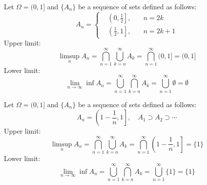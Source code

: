 \begin{example}
    Let $\Omega = (0, 1]$ and $\{A_n\}$ be a sequence of sets defined as follows:
    \begin{equation}
        A_n = \left\{\begin{aligned}
            &\left(0, \frac{1}{2}\right], &\quad n = 2k \\ 
            &\left(\frac{1}{2}, 1\right], &\quad n = 2k + 1
        \end{aligned}\right.
    \end{equation}
    Upper limit:
    \begin{equation}
        \limsup_n A_n = \bigcap_{n=1}^{\infty} \bigcup_{k=n}^{\infty} A_k = \bigcap_{n=1}^{\infty} (0, 1] = (0, 1]
    \end{equation}
    Lower limit:
    \begin{equation}
        \lim_{n \to \infty} \inf A_n = \bigcup_{n=1}^{\infty} \bigcap_{k=n}^{\infty} A_k = \bigcup_{n=1}^{\infty} \emptyset = \emptyset
    \end{equation}
\end{example}
\begin{example}
    Let $\Omega = (0, 1]$ and $\{A_n\}$ be a sequence of sets defined as follows:
    \begin{equation}
        A_n = \left(1 - \frac{1}{n}, 1\right], \quad A_1 \supset A_2 \supset \cdots
    \end{equation}
    Upper limit:
    \begin{equation}
        \limsup_n A_n = \bigcap_{n=1}^{\infty} \bigcup_{k=n}^{\infty} A_k = \bigcap_{n=1}^{\infty} \left(1 - \frac{1}{n}, 1\right] = \{1\}
    \end{equation}
    Lower limit:
    \begin{equation}
        \lim_{n \to \infty} \inf A_n = \bigcup_{n=1}^{\infty} \bigcap_{k=n}^{\infty} A_k = \bigcup_{n=1}^{\infty} \{1\} = \{1\}
    \end{equation}
\end{example}

